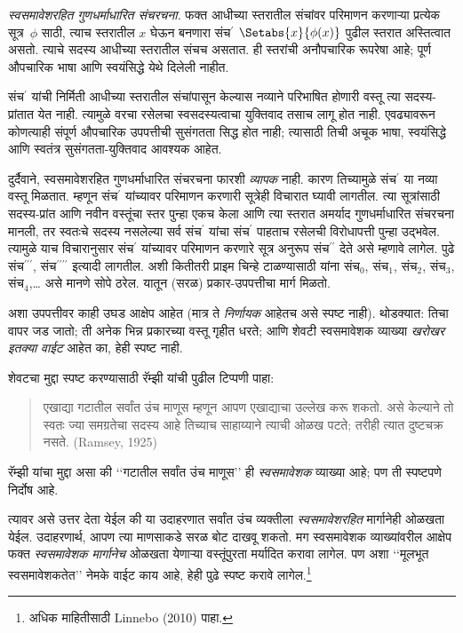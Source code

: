 \begin{defish}
\emph{स्वसमावेशरहित
गुणधर्माधारित
संचरचना.}
फक्त आधीच्या स्तरातील संचांवर परिमाणन करणाऱ्या
प्रत्येक सूत्र~$\phi$ साठी, त्याच स्तरातील $x$ घेऊन बनणारा
संच$^\prime$ $\Setabs{x}{\phi(x)}$ पुढील स्तरात अस्तित्वात असतो.
त्याचे सदस्य आधीच्या स्तरातील संचच असतात.
ही स्तरांची अनौपचारिक रूपरेषा आहे;
पूर्ण औपचारिक भाषा आणि स्वयंसिद्धे येथे दिलेली नाहीत.
\end{defish}

संच$^{\prime}$ यांची निर्मिती आधीच्या स्तरातील संचांपासून
केल्यास नव्याने परिभाषित होणारी वस्तू त्या सदस्य-प्रांतात येत नाही.
त्यामुळे वरचा रसेलचा स्वसदस्यत्वाचा युक्तिवाद तसाच लागू होत नाही.
एवढ्यावरून कोणत्याही संपूर्ण औपचारिक उपपत्तीची
सुसंगतता सिद्ध होत नाही; त्यासाठी तिची अचूक भाषा,
स्वयंसिद्धे आणि स्वतंत्र सुसंगतता-युक्तिवाद आवश्यक आहेत.

दुर्दैवाने,
स्वसमावेशरहित
गुणधर्माधारित
संचरचना फारशी
\emph{व्यापक}
नाही. कारण
तिच्यामुळे
संच$^\prime$
या नव्या
वस्तू मिळतात.
म्हणून संच$^\prime$
यांच्यावर
परिमाणन करणारी
सूत्रेही विचारात
घ्यावी लागतील.
त्या सूत्रांसाठी सदस्य-प्रांत आणि नवीन वस्तूंचा स्तर
पुन्हा एकच केला आणि त्या स्तरात अमर्याद गुणधर्माधारित
संचरचना मानली, तर स्वतःचे
सदस्य नसलेल्या
सर्व संच$^\prime$
यांचा संच$^\prime$
पाहताच रसेलची
विरोधापत्ती
पुन्हा उद्भवेल.
त्यामुळे याच
विचारानुसार
संच$^\prime$
यांच्यावर
परिमाणन करणारे
सूत्र अनुरूप
संच$^{\prime\prime}$
देते असे
म्हणावे लागेल.
पुढे
संच$^{\prime\prime\prime}$,
संच$^{\prime\prime\prime\prime}$
इत्यादी लागतील.
अशी कितीतरी
प्राइम चिन्हे
टाळण्यासाठी
यांना संच$_0$,
संच$_1$,
संच$_2$,
संच$_3$,
संच$_4$,\ldots
असे मानणे
सोपे ठरेल.
यातून (सरळ)
प्रकार-उपपत्तीचा
मार्ग मिळतो.

अशा उपपत्तीवर
काही उघड
आक्षेप आहेत
(मात्र ते
\emph{निर्णायक}
आहेतच असे
स्पष्ट नाही).
थोडक्यात:
तिचा वापर
जड जातो;
ती अनेक
भिन्न प्रकारच्या
वस्तू गृहीत
धरते; आणि
शेवटी
स्वसमावेशक
व्याख्या
\emph{खरोखर
इतक्या वाईट}
आहेत का,
हेही स्पष्ट
नाही.

शेवटचा मुद्दा
स्पष्ट करण्यासाठी
रॅम्झी
यांची पुढील
टिप्पणी पाहा:
\begin{quote}
  एखाद्या
  गटातील
  सर्वांत
  उंच माणूस
  म्हणून आपण
  एखाद्याचा
  उल्लेख करू
  शकतो. असे
  केल्याने तो
  स्वतः ज्या
  समग्रतेचा
  सदस्य आहे
  तिच्याच
  साहाय्याने
  त्याची ओळख
  पटते; तरीही
  त्यात दुष्टचक्र
  नसते.
  (Ramsey, 1925)
\end{quote}
रॅम्झी यांचा
मुद्दा असा
की ‘‘गटातील
सर्वांत उंच
माणूस’’ ही
\emph{स्वसमावेशक}
व्याख्या आहे;
पण ती
स्पष्टपणे
निर्दोष आहे.

त्यावर असे
उत्तर देता
येईल की
या उदाहरणात
सर्वांत उंच
व्यक्तीला
\emph{स्वसमावेशरहित}
मार्गानेही
ओळखता येईल.
उदाहरणार्थ,
आपण त्या
माणसाकडे
सरळ बोट
दाखवू
शकतो. मग
स्वसमावेशक
व्याख्यांवरील
आक्षेप फक्त
\emph{स्वसमावेशक
मार्गानेच}
ओळखता येणाऱ्या
वस्तूंपुरता
मर्यादित करावा
लागेल. पण
अशा
‘‘मूलभूत
स्वसमावेशकतेत’’
नेमके वाईट
काय आहे,
हेही पुढे
स्पष्ट करावे
लागेल.\footnote{
  अधिक माहितीसाठी
  Linnebo (2010)
  पाहा.}

